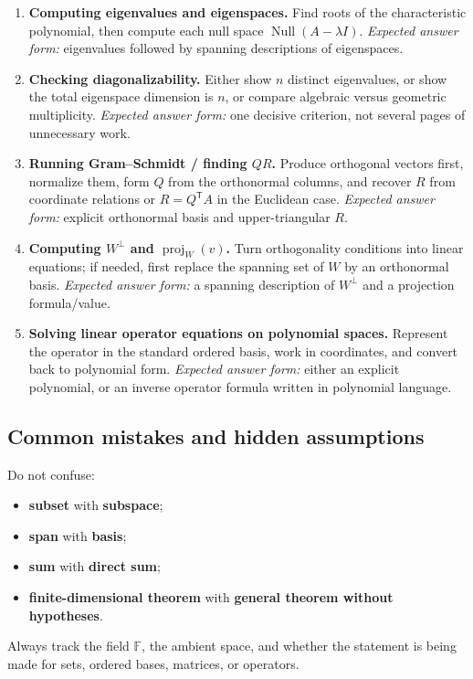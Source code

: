 \begin{examtip}[title={Exam Focus: high-frequency workflows and what each answer should look like}]
\begin{enumerate}[label=\textbf{Workflow \arabic*:}, leftmargin=*]
\item \textbf{Computing eigenvalues and eigenspaces.}  
Find roots of the characteristic polynomial, then compute each null space \(\operatorname{Null}(A-\lambda I)\).  
\emph{Expected answer form:} eigenvalues followed by spanning descriptions of eigenspaces.

\item \textbf{Checking diagonalizability.}  
Either show \(n\) distinct eigenvalues, or show the total eigenspace dimension is \(n\), or compare algebraic versus geometric multiplicity.  
\emph{Expected answer form:} one decisive criterion, not several pages of unnecessary work.

\item \textbf{Running Gram--Schmidt / finding \(Q R\).}  
Produce orthogonal vectors first, normalize them, form \(Q\) from the orthonormal columns, and recover \(R\) from coordinate relations or \(R=Q^{\mathsf T}A\) in the Euclidean case.  
\emph{Expected answer form:} explicit orthonormal basis and upper-triangular \(R\).

\item \textbf{Computing \(W^\perp\) and \(\operatorname{proj}_W(v)\).}  
Turn orthogonality conditions into linear equations; if needed, first replace the spanning set of \(W\) by an orthonormal basis.  
\emph{Expected answer form:} a spanning description of \(W^\perp\) and a projection formula/value.

\item \textbf{Solving linear operator equations on polynomial spaces.}  
Represent the operator in the standard ordered basis, work in coordinates, and convert back to polynomial form.  
\emph{Expected answer form:} either an explicit polynomial, or an inverse operator formula written in polynomial language.
\end{enumerate}
\end{examtip}

\subsection{Common mistakes and hidden assumptions}

\begin{commonmistake}[title={Common Mistake Cluster I: foundational structure}]
Do not confuse:
\begin{itemize}[leftmargin=*]
    \item \textbf{subset} with \textbf{subspace};
    \item \textbf{span} with \textbf{basis};
    \item \textbf{sum} with \textbf{direct sum};
    \item \textbf{finite-dimensional theorem} with \textbf{general theorem without hypotheses}.
\end{itemize}
Always track the field \(\mathbb{F}\), the ambient space, and whether the statement is being made for sets, ordered bases, matrices, or operators.
\end{commonmistake}

